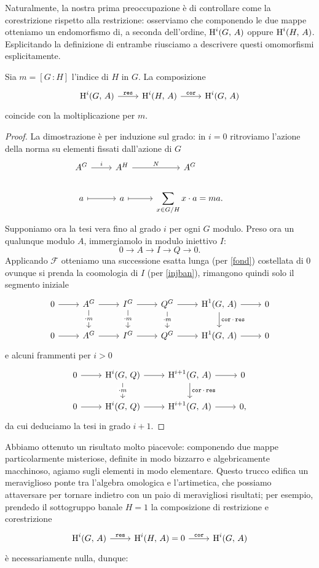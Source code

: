 Naturalmente, la nostra prima preoccupazione è di controllare come la corestrizione rispetto alla restrizione: osserviamo che componendo le due mappe otteniamo un endomorfismo di, a seconda dell'ordine, $ \operatorname{H}^i(G, \, A) $ oppure $ \operatorname{H}^i(H, \, A) $. Esplicitando la definizione di entrambe riusciamo a descrivere questi omomorfismi esplicitamente.

\begin{theorem}
	Sia $ m = [G \,\colon H] $ l'indice di $ H $ in $ G $. La composizione
	\[\begin{tikzcd}
	\HH^i(G, \, A) \rar["\Res"] & \HH^i(H, \, A) \rar["\Cor"] & \HH^i(G, \, A)
	\end{tikzcd}  \]
	coincide con la moltiplicazione per $ m $.
\end{theorem}
\begin{proof}
	La dimostrazione è per induzione sul grado: in $ i = 0 $ ritroviamo l'azione della norma su elementi fissati dall'azione di $ G $
	\[\begin{tikzcd}
	A^G \rar["i"] & A^H \rar["N"] & A^G & \\
	a \rar[mapsto] & a \rar[mapsto] & \displaystyle\sum_{x \in G/H} x \cdot a = ma.
	\end{tikzcd}  \]
	Supponiamo ora la tesi vera fino al grado $ i $ per ogni $ G $ modulo. Preso ora un qualunque modulo $ A $, immergiamolo in modulo iniettivo $ I $:
	\[ 0 \to A \to I \to Q \to 0. \]
	Applicando $ \mathcal{F} $ otteniamo una successione esatta lunga (per \ref{fond}) costellata di $ 0 $ ovunque si prenda la coomologia di $ I $ (per \ref{injban}), rimangono quindi solo il segmento iniziale
	\[\begin{tikzcd}
	0 \rar
	& A^G \rar\dar["\cdot m" description]
	& I^G \rar\dar["\cdot m" description] 
	& Q^G \rar\dar["\cdot m" description] 
	& \HH^1(G, \, A) \rar\dar["\Cor \cdot \Res"] 
	& 0 \\
	0 \rar 
	& A^G \rar 
	& I^G \rar 
	& Q^G \rar 
	& \HH^1(G, \, A) \rar 
	& 0
	\end{tikzcd}\]
	e alcuni frammenti per $ i > 0 $
	\[\begin{tikzcd}
	0 \rar & \HH^i(G, \, Q) \rar\dar["\cdot m" description] & \HH^{i+1}(G, \, A) \rar\dar["\Cor \cdot \Res"] & 0 \\
	0 \rar & \HH^i(G, \, Q) \rar & \HH^{i+1}(G, \, A) \rar & 0,
	\end{tikzcd}\]
	da cui deduciamo la tesi in grado $ i+1 $.
\end{proof}

Abbiamo ottenuto un risultato molto piacevole: componendo due mappe particolarmente misteriose, definite in modo bizzarro e algebricamente macchinoso, agiamo sugli elementi in modo elementare. Questo trucco edifica un meraviglioso ponte tra l'algebra omologica e l'artimetica, che possiamo attaversare per tornare indietro con un paio di meravigliosi risultati; per esempio, prendedo il sottogruppo banale $ H = 1 $ la composizione di restrizione e corestrizione
\[\begin{tikzcd}
\HH^i(G, \, A) \rar["\Res"] & \HH^i(H, \, A) = 0 \rar["\Cor"] & \HH^i(G, \, A)
\end{tikzcd}  \]
è necessariamente nulla, dunque:

